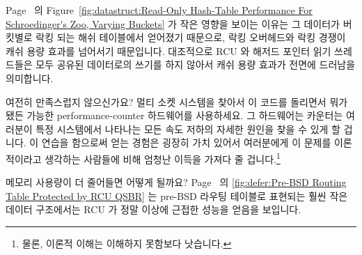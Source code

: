 {	\fi

	Page~\pageref{fig:datastruct:Read-Only Hash-Table Performance For Schroedinger's Zoo, Varying Buckets} 의
	Figure~\ref{fig:datastruct:Read-Only Hash-Table Performance For Schroedinger's Zoo, Varying Buckets}
	가 작은 영향을 보이는 이유는 그 데이터가 버킷별로 락킹 되는 해쉬
	테이블에서 얻어졌기 때문으로, 락킹 오버헤드와 락킹 경쟁이 캐쉬 용량
	효과를 넘어서기 때문입니다.
	대조적으로 RCU 와 해저드 포인터 읽기 쓰레드들은 모두 공유된 데이터로의
	쓰기를 하지 않아서 캐쉬 용량 효과가 전면에 드러남을 의미합니다.

	여전히 만족스럽지 않으신가요?
	멀티 소켓 시스템을 찾아서 이 코드를 돌리면서 뭐가 됐든 가능한
	performance-counter 하드웨어를 사용하세요.
	그 하드웨어는 카운터는 여러분이 특정 시스템에서 나타나는 모든 속도
	저하의 자세한 원인을 찾을 수 있게 할 겁니다.
	이 연습을 함으로써 얻는 경험은 굉장히 가치 있어서 여러분에게 이 문제를
	이론적이라고 생각하는 사람들에 비해 엄청난 이득을 가져다 줄
	겁니다.\footnote{
		물론, 이론적 이해는 이해하지 못함보다 낫습니다.}

}\QuickQuizEnd

메모리 사용량이 더 줄어들면 어떻게 될까요?
Page~\pageref{fig:defer:Pre-BSD Routing Table Protected by RCU QSBR With Non-Initial rcu-head} 의
\cref{fig:defer:Pre-BSD Routing Table Protected by RCU QSBR}
는 pre-BSD 라우팅 테이블로 표현되는 훨씬 작은 데이터 구조에서는 RCU 가 정말
이상에 근접한 성능을 얻음을 보입니다.

